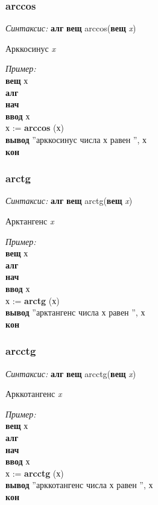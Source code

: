 \normalfont
\subsubsection{arccos}

\emph{Синтаксис:} \textbf{алг} \textbf{вещ} arccos(\textbf{вещ} \emph{x})


      
		
Арккосинус \emph{x}

\emph{Пример:}  
\sffamily
~\\\textbf{вещ} х
~\\\textbf{алг 
~\\нач
~\\\otstup ввод} х
~\\\otstup х := \textbf{arccos} (х)
~\\\otstup \textbf{вывод} ''арккосинус числа х равен '', х
~\\\textbf{кон}


\normalfont
\subsubsection{arctg}

\emph{Синтаксис:} \textbf{алг} \textbf{вещ} arctg(\textbf{вещ} \emph{x})


      
	
	Арктангенс \emph{x}
      
\emph{Пример:}  
\sffamily
~\\\textbf{вещ} х
~\\\textbf{алг 
~\\нач
~\\\otstup ввод} х
~\\\otstup х := \textbf{arctg} (х)
~\\\otstup \textbf{вывод} ''арктангенс числа х равен '', х
~\\\textbf{кон}

\normalfont
\subsubsection{arcctg}

\emph{Синтаксис:} \textbf{алг} \textbf{вещ} arcctg(\textbf{вещ} \emph{x})


      
		
Арккотангенс \emph{x}
      
\emph{Пример:}
\sffamily
~\\\textbf{вещ} х
~\\\textbf{алг 
~\\нач
~\\\otstup ввод} х
~\\\otstup х := \textbf{arcctg} (х)
~\\\otstup \textbf{вывод} ''арккотангенс числа х равен '', х
~\\\textbf{кон}

